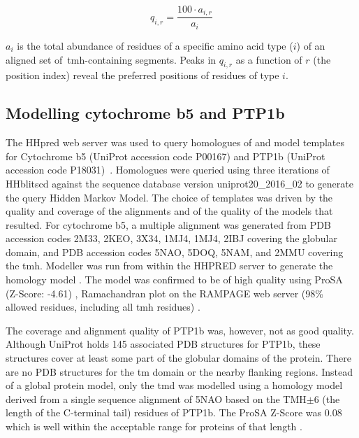 \begin{equation} \label{eq:independent_normalisation2}
        q_{i,r}=\frac{{100}\cdot{a_{i,r}}}{a_i}
\end{equation}

$a_i$ is the total abundance of residues of a specific amino acid type ($i$) of an aligned set of~\gls{tmh}-containing segments.
Peaks in $q_{i,r}$ as a function of $r$ (the position index) reveal the preferred positions of residues of type $i$.

\subsection{Modelling cytochrome b5 and PTP1b}
The HHpred web server was used to query homologues of and model templates for Cytochrome b5 (UniProt accession code P00167) and PTP1b (UniProt accession code P18031)~\cite{Soding2005}.
Homologues were queried using three iterations of HHblitscd against the sequence database version uniprot20\_2016\_02 to generate the query Hidden Markov Model.
The choice of templates was driven by the quality and coverage of the alignments and of the quality of the models that resulted.
For cytochrome b5, a multiple alignment was generated from PDB accession codes 2M33, 2KEO, 3X34, 1MJ4, 1MJ4, 2IBJ covering the globular domain, and PDB accession codes 5NAO, 5DOQ, 5NAM, and 2MMU covering the \gls{tmh}.
Modeller was run from within the HHPRED server to generate the homology model \cite{Eswar2007, Webb2016}.
The model was confirmed to be of high quality using ProSA (Z-Score: -4.61) \cite{Wiederstein2007}, Ramachandran plot on the RAMPAGE web server (98\% allowed residues, including all \gls{tmh} residues) \cite{Lovell2003}.

The coverage and alignment quality of PTP1b was, however, not as good quality.
Although UniProt holds 145 associated PDB structures for PTP1b, these structures cover at least some part of the globular domains of the protein.
There are no PDB structures for the \gls{tm} domain or the nearby flanking regions.
Instead of a global protein model, only the \gls{tmd} was modelled using a homology model derived from a single sequence alignment of 5NAO based on the TMH$\pm$6 (the length of the C\--terminal tail) residues of PTP1b.
The ProSA Z-Score was 0.08 which is well within the acceptable range for proteins of that length \cite{Wiederstein2007}.


